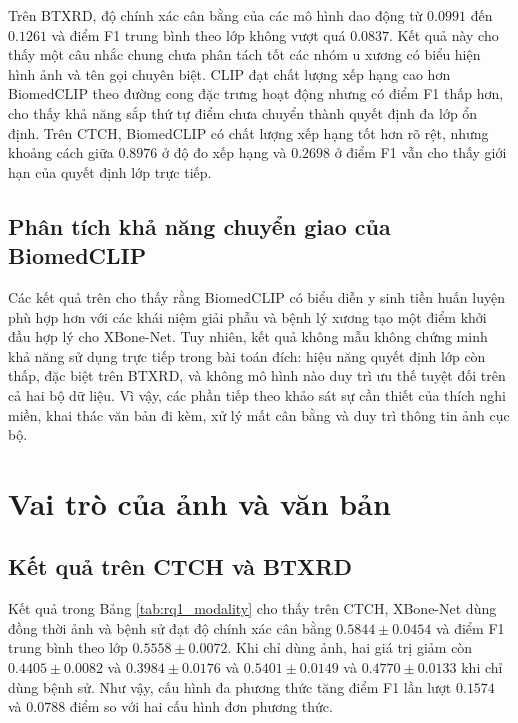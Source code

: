 

Trên BTXRD, độ chính xác cân bằng của các mô hình dao động từ $0{.}0991$ đến $0{.}1261$ và điểm F1 trung bình theo lớp không vượt quá $0{.}0837$. Kết quả này cho thấy một câu nhắc chung chưa phân tách tốt các nhóm u xương có biểu hiện hình ảnh và tên gọi chuyên biệt. CLIP đạt chất lượng xếp hạng cao hơn BiomedCLIP theo đường cong đặc trưng hoạt động nhưng có điểm F1 thấp hơn, cho thấy khả năng sắp thứ tự điểm chưa chuyển thành quyết định đa lớp ổn định. Trên CTCH, BiomedCLIP có chất lượng xếp hạng tốt hơn rõ rệt, nhưng khoảng cách giữa $0{.}8976$ ở độ đo xếp hạng và $0{.}2698$ ở điểm F1 vẫn cho thấy giới hạn của quyết định lớp trực tiếp.

\subsection{Phân tích khả năng chuyển giao của BiomedCLIP}
Các kết quả trên cho thấy rằng BiomedCLIP có biểu diễn y sinh tiền huấn luyện phù hợp hơn với các khái niệm giải phẫu và bệnh lý xương tạo một điểm khởi đầu hợp lý cho XBone-Net. Tuy nhiên, kết quả không mẫu không chứng minh khả năng sử dụng trực tiếp trong bài toán đích: hiệu năng quyết định lớp còn thấp, đặc biệt trên BTXRD, và không mô hình nào duy trì ưu thế tuyệt đối trên cả hai bộ dữ liệu. Vì vậy, các phần tiếp theo khảo sát sự cần thiết của thích nghi miền, khai thác văn bản đi kèm, xử lý mất cân bằng và duy trì thông tin ảnh cục bộ.

\section{Vai trò của ảnh và văn bản}
\label{sec:modality_role}

\subsection{Kết quả trên CTCH và BTXRD}
\label{subsec:rq1_modality_results}
Kết quả trong Bảng \ref{tab:rq1_modality} cho thấy trên CTCH, XBone-Net dùng đồng thời ảnh và bệnh sử đạt độ chính xác cân bằng $0{.}5844\pm0{.}0454$ và điểm F1 trung bình theo lớp $0{.}5558\pm0{.}0072$. Khi chỉ dùng ảnh, hai giá trị giảm còn $0{.}4405\pm0{.}0082$ và $0{.}3984\pm0{.}0176$ và $0{.}5401\pm0{.}0149$ và $0{.}4770\pm0{.}0133$ khi chỉ dùng bệnh sử. Như vậy, cấu hình đa phương thức tăng điểm F1 lần lượt $0{.}1574$ và $0{.}0788$ điểm so với hai cấu hình đơn phương thức.

